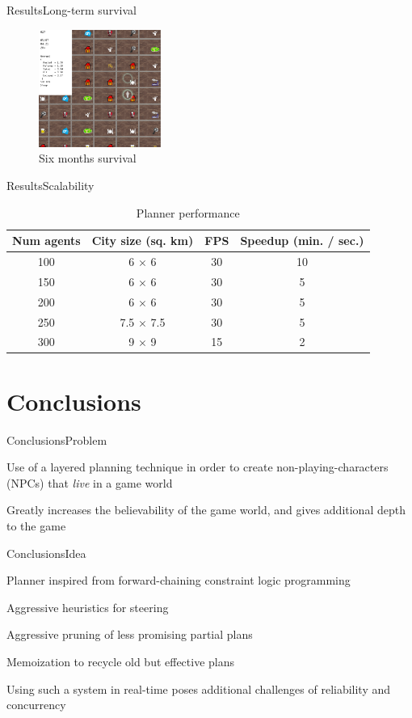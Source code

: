 \documentclass{beamer}
\begin{document}
\begin{textslide}{Results}{Long-term survival}{
\begin{figure}
\center
\includegraphics[width=4cm]{Pics/six_months.png}
\caption{Six months survival}
\label{fig:mortality_rate}
\end{figure}
}\end{textslide}

\begin{textslide}{Results}{Scalability}{
\begin{table}
\center
\begin{tabular}{| c | c | c | c |}
\hline
Num agents & City size (sq. km) & FPS & Speedup (min. / sec.) \\
\hline
100 & 6 $\times$ 6 & 30 & 10 \\
150 & 6 $\times$ 6 & 30 & 5 \\
200 & 6 $\times$ 6 & 30 & 5 \\
250 & 7.5 $\times$ 7.5 & 30 & 5 \\
300 & 9 $\times$ 9 & 15 & 2 \\
\hline
\end{tabular}
\caption{Planner performance}
\label{tab:planner_performance}
\end{table}
}\end{textslide}

\section{Conclusions}
\begin{slide}{Conclusions}{Problem}{
\item Use of a layered planning technique in order to create non-playing-characters (NPCs) that \textit{live} in a game world
\item Greatly increases the believability of the game world, and gives additional depth to the game
}\end{slide}

\begin{slide}{Conclusions}{Idea}{
\item Planner inspired from forward-chaining constraint logic programming
\item Aggressive heuristics for steering
\item Aggressive pruning of less promising partial plans
\item Memoization to recycle old but effective plans
\item Using such a system in real-time poses additional challenges of reliability and concurrency
}\end{slide}
\end{document}
